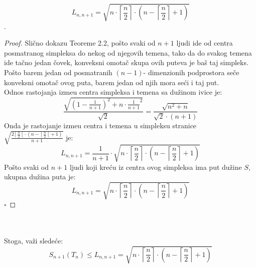\documentclass[11pt,letter]{article}
\begin{document}
$$L_{n,n+1}=\sqrt{n\cdot\left\lceil\frac{n}{2}\right\rceil\cdot\left( n-\left\lceil\frac{n}{2}\right\rceil+1\right)}$$.
\\
\smallskip
\begin{proof}
Sli\v cno dokazu Teoreme 2.2, po\v sto svaki od $n+1$ ljudi ide od centra posmatranog simpleksa do nekog od njegovih temena, tako da do svakog temena ide ta\v cno jedan \v covek, konveksni omota\v c skupa ovih puteva je ba\v s taj simpleks. Po\v sto barem jedan od posmatranih $(n-1)$- dimenzionih podprostora se\v ce konveksni omota\v c ovog puta, barem jedan od njih mora se\' ci i taj put. 
\\
 Odnos rastojanja izme\dj u centra simpleksa i temena sa du\v zinom ivice je:
$$\frac{\sqrt{\left( 1-\frac{1}{n+1}\right)^2+n\cdot{\frac{1}{n+1}}^2}}{\sqrt2}=\frac{\sqrt{n^2+n}}{\sqrt2 \cdot(n+1)}$$
\indent Onda je rastojanje izme\dj u centra i temena u simpleksu stranice  $\sqrt{\frac{2\left\lceil \frac{n}{2}\right\rceil\cdot \left( n-\left\lceil\frac{n}{2}\right\rceil+1\right)}{n+1}}$ je:
$$L_{n,n+1}=\frac{1}{n+1}\cdot\sqrt{n\cdot\left\lceil\frac{n}{2}\right\rceil\cdot\left( n-\left\lceil\frac{n}{2}\right\rceil+1\right)}$$
Po\v sto svaki od $n+1$ ljudi koji kre\' cu iz centra ovog simpleksa ima put du\v zine $S$, ukupna du\v zina puta je:
$$L_{n,n+1}=\sqrt{n\cdot\left\lceil\frac{n}{2}\right\rceil\cdot\left( n-\left\lceil\frac{n}{2}\right\rceil +1\right)}$$
$\square$
\end{proof}
\\
\\
Stoga, va\v zi slede\' ce:
$$S_{n+1}(T_n)\leqslant L_{n,n+1}= \sqrt{n\cdot\left\lceil\frac{n}{2}\right\rceil\cdot\left( n-\left\lceil\frac{n}{2}\right\rceil +1\right)}$$
\end{document}
